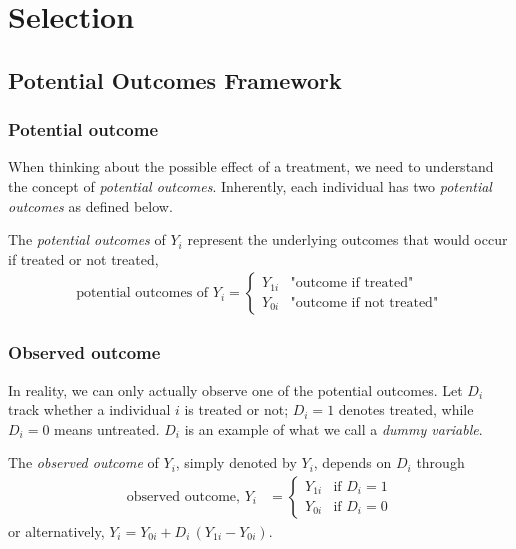 \chapter{Selection}
    \section{Potential Outcomes Framework}
        \subsection{Potential outcome}
            When thinking about the possible effect of a treatment, we need to understand the concept of \textit{potential outcomes}. Inherently, each individual has two \textit{potential outcomes} as defined below.
            \begin{definition}
                The \textit{potential outcomes} of $Y_i$ represent the underlying outcomes that would occur if treated or not treated,
                \begin{align}
                    \text{potential outcomes of } Y_i=\begin{cases}
                        Y_{1i}  &\text{"outcome if treated"}   \\
                        Y_{0i}  &\text{"outcome if not treated"}
                    \end{cases}
                \end{align}
            \end{definition}

        \subsection{Observed outcome}
            In reality, we can only actually observe one of the potential outcomes. Let $D_i$ track whether a individual $i$ is treated or not; $D_i = 1$ denotes treated, while $D_i = 0$ means untreated. $D_i$ is an example of what we call a \textit{dummy variable}. 
            \begin{definition}
                The \textit{observed outcome} of $Y_i$, simply denoted by $Y_i$, depends on $D_i$ through
                \begin{align}
                    \text{observed outcome, } Y_i &=
                    \begin{cases}
                        Y_{1i}  &\text{if }D_i=1\\
                        Y_{0i}  &\text{if }D_i=0
                    \end{cases}
                \end{align}
                or alternatively, $Y_i = Y_{0i}+D_i\,(Y_{1i}-Y_{0i})$.
            \end{definition}

